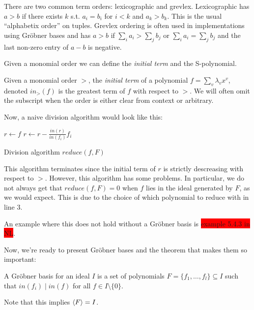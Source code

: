 \documentclass{article}
\theoremstyle{changedot}
\theoremstyle{changedotbreak}
\theoremstyle{nonumberplain}
\DeclarePairedDelimiter{\tuple}{\langle}{\rangle}
\begin{document}
There are two common term orders: lexicographic and grevlex. Lexicographic has $a > b$ if there exists $k$ s.t. $a_{i} = b_{i}$ for $i < k$ and $a_{k} > b_{k}$. This is the usual ``alphabetix order'' on tuples. Grevlex ordering is often used in implementations using Gröbner bases and has $a > b$ if $\sum_{i} a_{i} > \sum_{j} b_{j}$ or   $\sum_{i} a_{i} = \sum_{j} b_{j}$ and the last non-zero entry of $a - b$ is negative.

Given a monomial order we can define the \emph{initial term} and the S-polynomial.

\begin{definition}
  Given a monomial order $>$, the \emph{initial term} of a polynomial $f = \sum_{v} \lambda_{v} x^{v}$, denoted $in_{>}(f)$ is the greatest term of $f$ with respect to $>$. We will often omit the subscript when the order is either clear from context or arbitrary.
\end{definition}


Now, a naive division algorithm would look like this:

\begin{algorithm}[H]
\DontPrintSemicolon

  $r \leftarrow f$\;
    {
        $r \leftarrow r - \frac{in(r)}{in(f_{i})} f_{i}$
    }

    \caption{Division algorithm $reduce(f, F)$}
    \label{alg:div}
\end{algorithm}

This algorithm terminates since the initial term of $r$ is strictly descreasing with respect to $>$. However, this algorithm has some problems. In particular, we do not always get that $reduce(f, F) = 0$ when $f$ lies in the ideal generated by $F$, as we would expect. This is due to the choice of which polynomial to reduce with in line 3.

An example where this does not hold without a Gröbner basis is \colorbox{red}{example 5.4.3 in NL}.

Now, we're ready to present Gröbner bases and the theorem that makes them so important:

\begin{definition}
  A Gröbner basis for an ideal $I$ is a set of polynomials $F = \{f_{1}, \dots, f_{l}\} \subseteq I$ such that $in(f_{i}) \mid in(f)$ for all $f \in I\setminus \{0\}$.

  Note that this implies $\tuple F = I$.
\end{definition}
\end{document}
